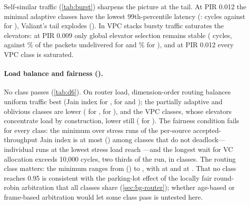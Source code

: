 Self-similar traffic (\cref{tab:burst}) sharpens the picture at the tail. At PIR 0.012 the minimal adaptive classes have the lowest 99th-percentile latency (:  cycles against  for ), Valiant's tail explodes (). In VPC stacks bursty traffic saturates the elevators: at PIR 0.009 only global elevator selection remains stable ( cycles, against \% of the packets undelivered for  and \% for ), and at PIR 0.012 every VPC class is saturated.

\begin{table}[tbp]
\centering
\caption{Self-similar (ON/OFF Pareto) traffic: mean and 99th-percentile latency (cycles), five seeds. $^\ast$More than 1\% of the packets undelivered (saturated; delivered packets only, not ranked).}
\label{tab:burst}
\small

\end{table}

\paragraph{Load balance and fairness ().} No class passes  (\cref{tab:d6}). On router load, dimension-order routing balances uniform traffic best (Jain index  for ,  for  and ); the partially adaptive and oblivious classes are lower ( for ,  for ), and the VPC classes, whose elevators concentrate load by construction, lower still ( for ). The fairness condition fails for every class: the minimum over stress runs of the per-source accepted-throughput Jain index is at most  () among classes that do not deadlock---individual runs at the lowest stress load reach ---and the longest wait for VC allocation exceeds 10,000 cycles, two thirds of the run, in  classes. The routing class matters: the minimum ranges from  () to , with  at  and  at . That no class reaches 0.95 is consistent with the parking-lot effect of the locally fair round-robin arbitration that all classes share (\cref{sec:bg-router}); whether age-based or frame-based arbitration would let some class pass is untested here.

